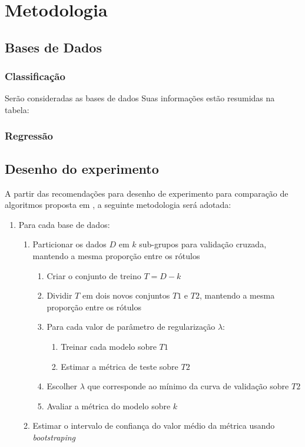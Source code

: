 \documentclass[conference]{IEEEtran}
\begin{document}
	
	\section{Metodologia}
	\subsection{Bases de Dados}
	
	\subsubsection{Classificação}
	Serão consideradas as bases de dados 
	Suas informações estão resumidas na tabela:

	\subsubsection{Regressão}
	\subsection{Desenho do experimento}
	A partir das recomendações para desenho de experimento para comparação de algoritmos proposta em \cite{salzberg1997comparing}, a seguinte metodologia será adotada:
	\begin{enumerate}
		\item Para cada base de dados:
			\begin{enumerate}
			\item Particionar os dados $D$ em $k$ sub-grupos para validação cruzada, mantendo a mesma proporção entre os rótulos
			\begin{enumerate}
				\item Criar o conjunto de treino $T = D - k$
				\item Dividir $T$ em dois novos conjuntos $T1$ e $T2$, mantendo a mesma proporção entre os rótulos
				\item Para cada valor de parâmetro de regularização $\lambda$:
				\begin{enumerate}
					\item Treinar cada modelo sobre $T1$
					\item Estimar a métrica de teste sobre $T2$
				\end{enumerate}
				\item Escolher $\lambda$ que corresponde ao mínimo da curva de validação sobre $T2$
				\item Avaliar a métrica do modelo sobre $k$
			\end{enumerate}
			\item Estimar o intervalo de confiança do valor médio da métrica usando \textit{bootstraping}
		\end{enumerate}
		
	\end{enumerate}
\end{document}
